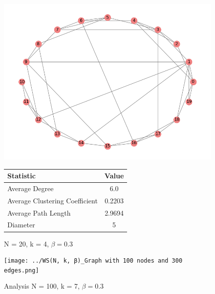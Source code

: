 \documentclass[10pt,letterpaper, onecolumn]{report}
\begin{document}
\begin{flushleft}
    \begin{figure}[htbp!]
        \centering
        \begin{minipage}{0.5\textwidth} %
            \centering
            \includegraphics[width=\textwidth]{../WS.png} %
            \caption{N = 20, k = 4, $\beta = 0.3$}
            \label{fig:ws_graph}
        \end{minipage}%
        \begin{minipage}{0.5\textwidth} %
            \centering
            \begin{tabular}{|l|c|}
                \hline
                \textbf{Statistic} & \textbf{Value} \\
                \hline
                Average Degree & 6.0 \\
                Average Clustering Coefficient & 0.2203 \\
                Average Path Length & 2.9694 \\
                Diameter & 5 \\
                \hline
            \end{tabular}
            \label{tab:graph_stats}
        \end{minipage}
    \end{figure}
    \begin{figure}[htbp!] %
        \centering
        \texttt{[image: ../WS(N, k, β)\_Graph with 100 nodes and 300 edges.png]} %
        \caption{Analysis N = 100, k = 7, $\beta = 0.3$} %
    \end{figure}
    
    
\end{flushleft}
\end{document}
